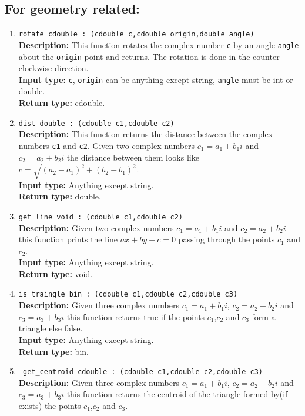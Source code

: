 \documentclass[12pt]{article}
\begin{document}
\subsection{For geometry related:}
\begin{enumerate}
    \item \texttt{rotate cdouble : (cdouble c,cdouble origin,double angle)} \\ 
    \textbf{Description:} This function rotates the complex number \texttt{c} by an angle \texttt{angle} about the \texttt{origin} point and returns. The rotation is done in the counter-clockwise direction. \\
    \textbf{Input type:} \texttt{c}, \texttt{origin} can be anything except string, \texttt{angle} must be int or double. \\
    \textbf{Return type:} cdouble.
    \item \texttt{dist double : (cdouble c1,cdouble c2)} \\
    \textbf{Description:} This function returns the distance between the complex numbers \texttt{c1} and \texttt{c2}. Given two complex numbers $c_1=a_1+b_1i$ and $c_2=a_2+b_2i$ the distance between them looks like $c=\sqrt{(a_2-a_1)^2+(b_2-b_1)^2}$.\\
    \textbf{Input type:} Anything except string. \\
    \textbf{Return type:} double.
    \item \texttt{get\_line void : (cdouble c1,cdouble c2)} \\ 
    \textbf{Description:} Given two complex numbers $c_1=a_1+b_1i$ and $c_2=a_2+b_2i$ this function prints the line $ax+by+c=0$ passing through the points $c_1$ and $c_2$.\\
    \textbf{Input type:} Anything except string. \\
    \textbf{Return type:} void.
    \item \texttt{is\_traingle bin : (cdouble c1,cdouble c2,cdouble c3)} \\ 
    \textbf{Description:} Given three complex numbers $c_1=a_1+b_1i$, $c_2=a_2+b_2i$ and $c_3=a_3+b_3i$ this function returns true if the points $c_1$,$c_2$ and $c_3$ form a triangle else false.\\
    \textbf{Input type:} Anything except string. \\
    \textbf{Return type:} bin.
    \item \texttt{ get\_centroid cdouble : (cdouble c1,cdouble c2,cdouble c3)} \\
    \textbf{Description:} Given three complex numbers $c_1=a_1+b_1i$, $c_2=a_2+b_2i$ and $c_3=a_3+b_3i$ this function returns the centroid of the triangle formed by(if exists) the points $c_1$,$c_2$ and $c_3$.\\

\end{enumerate}
\end{document}
